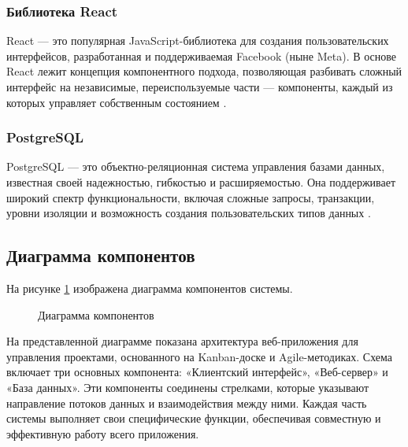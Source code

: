 \subsubsection{Библиотека React}
React — это популярная JavaScript-библиотека для создания пользовательских интерфейсов, разработанная и поддерживаемая Facebook (ныне Meta). В основе React лежит концепция компонентного подхода, позволяющая разбивать сложный интерфейс на независимые, переиспользуемые части — компоненты, каждый из которых управляет собственным состоянием \cite{react1}.

\subsubsection{PostgreSQL}

PostgreSQL — это объектно-реляционная система управления базами данных, известная своей надежностью, гибкостью и расширяемостью. Она поддерживает широкий спектр функциональности, включая сложные запросы, транзакции, уровни изоляции и возможность создания пользовательских типов данных \cite{postgres1}.

\subsection{Диаграмма компонентов}

 На рисунке \ref{components_diagram.eps:image} изображена диаграмма компонентов системы.
 
 \begin{figure}[ht]
 	\caption{Диаграмма компонентов}
 	\label{components_diagram.eps:image}
 \end{figure}
 
 На представленной диаграмме показана архитектура веб-приложения для управления проектами, основанного на Kanban-доске и Agile-методиках. Схема включает три основных компонента: «Клиентский интерфейс», «Веб-сервер» и «База данных». Эти компоненты соединены стрелками, которые указывают направление потоков данных и взаимодействия между ними. Каждая часть системы выполняет свои специфические функции, обеспечивая совместную и эффективную работу всего приложения.
 
